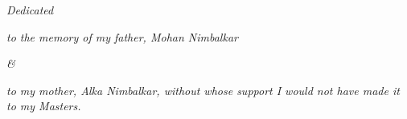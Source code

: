 \newpage
\fchapter[Dedication]{}
\thispagestyle{plain}
\vfil\null
\begin{center}

\mbox{}\vspace{1.5in}

\emph{Dedicated}
\vspace{0.2in}

\emph{to the memory of my father, Mohan Nimbalkar}
\vspace{0.2in}

\emph{\&}

\vspace{0.2in}
\emph{to my mother, Alka Nimbalkar, without whose support I would not have made it to my Masters.}


\end{center} 
\normalsize
\vfil\null
